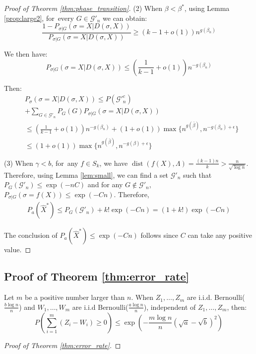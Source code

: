 \documentclass[entropy,article,accept,moreauthors,pdftex]{Definitions/mdpi}
\newcommand{\A}{\frac{a \log n}{n}}
\newcommand{\B}{\frac{b \log n}{n}}
\newcommand{\cG}{\mathcal{G}}
\newcommand{\1}{\mathbbm{1}}
\DeclareMathOperator{\Dist}{dist}
\begin{document}
\begin{paracol}{2}
\begin{proof}[Proof of Theorem \ref{thm:phase_transition}]
	(2) When $\beta < \beta^*$, using Lemma \ref{prop:large2}, for~every $G \in \cG'_n$
	we can obtain:
	$$
	\frac{1-P_{\sigma | G}(\sigma=X | D(\sigma, X))}{P_{\sigma | G}(\sigma=X | D(\sigma, X))}\geq (k-1+o(1))n^{g(\beta_n)}
	$$
	
	We then have:
	$$
	P_{\sigma | G}(\sigma=X| D(\sigma, X)) \leq \left(\frac{1}{k-1}+o(1) \right) n^{-g(\beta_n)}
	$$
	
	Then:
	\begin{align*}
	&P_{\sigma}(\sigma=X| D(\sigma, X))  \leq  P(\cG'^c_n) \\
	&+ \sum_{G\in \cG'_n}P_G(G) P_{\sigma|G}(\sigma=X| D(\sigma, X)) \\
	& \leq (\frac{1}{k-1}+o(1))n^{-g(\beta_n)} + (1+o(1)) \max\{n^{g(\bar{\beta})}, n^{- g(\beta_n) + \epsilon} \}\\
	& \leq (1+o(1)) \max\{n^{g(\bar{\beta})}, n^{-g(\beta) + \epsilon}  \}
	\end{align*}
	
	(3) When $\gamma < b$, for~any $f\in S_k$, we have $\Dist(f(X), \Lambda) = \frac{(k-1)n}{k} > \frac{n}{\sqrt{\log n}}$.
	Therefore, using Lemma \ref{lem:small}, we can find a set $\cG'_n$ such that $P_G(\cG'_n) \leq \exp(-nC)$
	and for any $G\not \in \cG'_n$, $P_{\sigma |G}(\sigma = f(X)) \leq \exp(-Cn)$. Therefore,
	\begin{align*}
	P_a(\hat{X}^*) \leq P_G(\cG'_n) + k! \exp(-Cn) = (1+k!)\exp(-Cn)
	\end{align*}
	
	The conclusion of $P_a(\hat{X}^*) \leq \exp(-Cn)$ follows since $C$ can take any positive value.
\end{proof}

\subsection{Proof of Theorem \ref{thm:error_rate}}


\begin{Lemma}\label{lem:mZW}
	Let $m$ be a positive number larger than $n$.
	When $Z_1, \dots, Z_m$ are i.i.d. Bernoulli($\B$) and $W_1, \dots, W_m$ are i.i.d Bernoulli($\A$), independent of $Z_1, \dots, Z_m$,
	then:
\begin{equation}
	P(\sum_{i=1}^m (Z_i  - W_i) \geq 0) \leq \exp(-\frac{m \log n}{n}(\sqrt{a} - \sqrt{b})^2)
	\end{equation}
\end{Lemma}
\begin{proof}[Proof of Theorem \ref{thm:error_rate}]


\end{proof}
\end{paracol}
\end{document}
